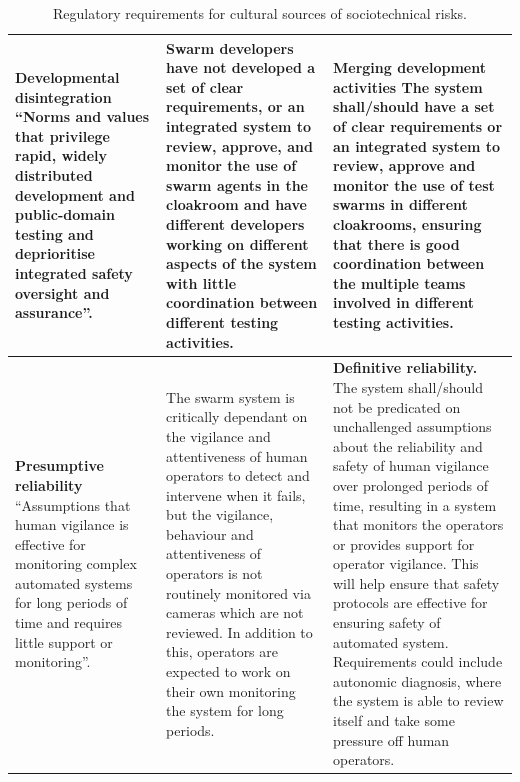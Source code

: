 \documentclass[lettersize,journal]{IEEEtran}
\begin{document}
\begin{landscape}
\begin{table}[]
\begin{tabular}{|p{0.3\textheight}|p{0.3\textheight}|p{0.4\textheight}|}
        \hline
        \textbf{Developmental disintegration} ``Norms and values that privilege rapid, widely distributed development and public-domain testing and deprioritise integrated safety oversight and assurance”. \cite{macrae2021learning} & Swarm developers have not developed a set of clear requirements, or an integrated system to review, approve, and monitor the use of swarm agents in the cloakroom and have different developers working on different aspects of the system with little coordination between different testing activities. & \textbf{Merging development activities} The system shall/should have a set of clear requirements or an integrated system to review, approve and monitor the use of test swarms in different cloakrooms, ensuring that there is good coordination between the multiple teams involved in different testing activities. \\
        \hline
        \textbf{Presumptive reliability } ``Assumptions that human vigilance is effective for monitoring complex automated systems for long periods of time and requires little support or monitoring”. \cite{macrae2021learning} & The swarm system is critically dependant on the vigilance and attentiveness of human operators to detect and intervene when it fails, but the vigilance, behaviour and attentiveness of operators is not routinely monitored via cameras which are not reviewed. In addition to this, operators are expected to work on their own monitoring the system for long periods. & \textbf{Definitive reliability.} The system shall/should not be predicated on unchallenged assumptions about the reliability and safety of human vigilance over prolonged periods of time, resulting in a system that monitors the operators or provides support for operator vigilance. This will help ensure that safety protocols are effective for ensuring safety of automated system. Requirements could include autonomic diagnosis, where the system is able to review itself and take some pressure off human operators. \\
        \hline
    \end{tabular}
    \caption{Regulatory requirements for cultural sources of sociotechnical risks.}%
    \label{tab:tab_5}
\end{table}
\end{landscape}

%
%


\vfill
\end{document}
